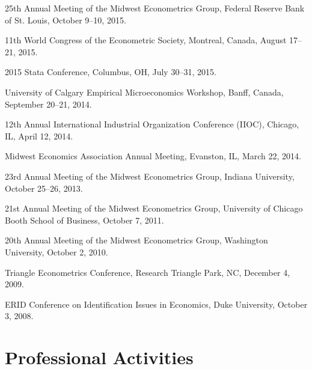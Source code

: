 \documentclass[10pt,letterpaper]{article}
\renewenvironment{itemize}{
  \begin{list}{}{
    \setlength{\leftmargin}{1.5em}
    \setlength{\itemsep}{0.25em}
    \setlength{\parskip}{0pt}
    \setlength{\parsep}{0.25em}
  }
}{
  \end{list}
}
\begin{document}
\begin{itemize}
\item 25th Annual Meeting of the Midwest Econometrics Group,
  Federal Reserve Bank of St. Louis, October 9--10, 2015. %
\item 11th World Congress of the Econometric Society,
  Montreal, Canada, August 17--21, 2015. %
\item 2015 Stata Conference, Columbus, OH, July 30--31, 2015. %
\item University of Calgary Empirical Microeconomics Workshop,
  Banff, Canada, September 20--21, 2014. %
\item 12th Annual International Industrial Organization Conference (IIOC),
  Chicago, IL, April 12, 2014. %
\item Midwest Economics Association Annual Meeting,
  Evanston, IL, March 22, 2014. %
\item 23rd Annual Meeting of the Midwest Econometrics Group,
  Indiana University, October 25--26, 2013. %
\item 21st Annual Meeting of the Midwest Econometrics Group,
  University of Chicago Booth School of Business, October 7, 2011. %
\item 20th Annual Meeting of the Midwest Econometrics Group,
  Washington University, October 2, 2010. %
\item Triangle Econometrics Conference,
  Research Triangle Park, NC, December 4, 2009. %
\item ERID Conference on Identification Issues in Economics,
  Duke University, October 3, 2008. %
\end{itemize}

\section*{Professional Activities}
\end{document}
